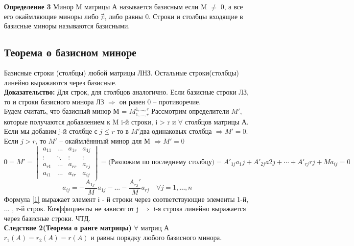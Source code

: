 \documentclass[a4paper,12pt]{article} %
\begin{document}
	   \textbf{Определение 3} 
	   Минор M матрицы А называется базисным если M $\neq$ 0, а все его окаймляющие миноры либо $\nexists$, либо равны 0. Строки и столбцы входящие в базисные миноры называются базисными.\\
	   
	   \subsection{Теорема о базисном миноре}
		Базисные строки (столбцы) любой матрицы ЛНЗ. Остальные строки(столбцы) линейно выражаются через  базисные.\\
		\textbf{Доказательство:} Для строк, для столбцов аналогично.
		Если базисные строки ЛЗ, то и строки базисного минора ЛЗ $\Rightarrow$ он равен 0 -- противоречие.\\
		Будем считать, что базисный	 минор М = $M_{1,\dotso,r}^{1,\dotso,r}$
		Рассмотрим определители $M'$, которые получаются добавлением к M i-й строки,  i > r и $\forall$ столбцов матрицы А.\\
		Если мы добавим j-й столбце с $j \leq r$ то в  $M'$два одинаковых столбца $\Rightarrow M' = 0$.\\
		Если $j > r$, то $M'$ -- окаймлённный минор для М $\Rightarrow M' = 0$
		$$
		0 = M' =\begin{vmatrix}
			a_{11} & \dotso & a_{1r} & a_{1j} \\
			\vdots & \ddots &\vdots & \vdots\\
			a_{r1} & \dotso & a_{rr} & a_{rj}\\
			a_{i1} & \dotso & a_{ir} & a_{ij}
		\end{vmatrix} = \text{(Разложим по последнему столбцу)}=A'_{1j}a_1j
 + A'_{2j}a{2j} + \dotsb + A'_{rj}{rj}+Ma_{ij} = 0	  $$
 \begin{equation}
 	\label{1}
 	a_{ij} = -\dfrac{A_{1j}'}{M}a_{1j} - \dotso - \dfrac{A_{rj}'}{M}a_{rj} \quad \forall j = 1,\dotso ,n
 \end{equation}
 Формула \eqref{1} выражает элемент i - й строки через соответствующие элементы 1-й, ... , r-й строк. Коэффициенты не зависят от j $\Rightarrow$ i-я строка линейно выражается через базисные строки. ЧТД.\\
 
 
 \textbf{Следствие 2(Теорема о ранге матрицы)} 
$\forall$ матриц А $r_1(A) = r_2(A) = r(A)$ и равны порядку любого базисного минора. 
\end{document}

